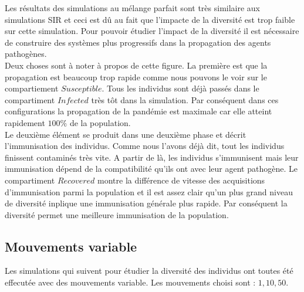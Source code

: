 Les résultats des simulations au mélange parfait sont très similaire aux simulations SIR et ceci est dû au fait que l'impacte de la diversité est trop faible sur cette simulation. Pour pouvoir étudier l'impact de la diversité il est nécessaire de construire des systèmes plus progressifs dans la propagation des agents pathogènes.\\

Deux choses sont à noter à propos de cette figure. La première est que la propagation est beaucoup trop rapide comme nous pouvons le voir sur le compartiement $Susceptible$. Tous les individus sont déjà passés dans le compartiment $Infected$ très tôt dans la simulation. Par conséquent dans ces configurations la propagation de la pandémie est maximale car elle atteint rapidement $100\%$ de la population.\\

Le deuxième élément se produit dans une deuxième phase et décrit l'immunisation des individus. Comme nous l'avons déjà dit, tout les individus finissent contaminés très vite. A partir de là, les individus s'immunisent mais leur immunisation dépend de la compatibilité qu'ils ont avec leur agent pathogène. Le compartiment $Recovered$ montre la différence de vitesse des acquisitions d'immunisation parmi la population et il est assez clair qu'un plus grand niveau de diversité inplique une immunisation générale plus rapide. Par conséquent la diversité permet une meilleure immunisation de la population.

\newpage

\subsection{Mouvements variable}

Les simulations qui suivent pour étudier la diversité des individus ont toutes été effecutée avec des mouvements variable. Les mouvements choisi sont : $1,10,50$.

